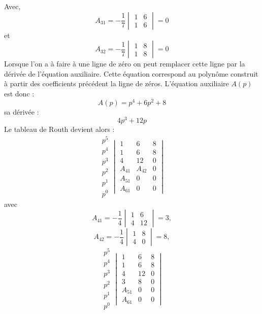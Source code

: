Avec,
\[
A_{31}=-\dfrac{1}{7}\begin{vmatrix}1 & 6 \\ 1& 6\end{vmatrix} = 0
\]
et 
\[
A_{32}=-\dfrac{1}{7}\begin{vmatrix}1 & 8 \\ 1& 8\end{vmatrix} = 0
\]
Lorsque l'on a à faire à une ligne de zéro on peut remplacer cette ligne 
par la dérivée de l'équation auxiliaire. Cette équation correspond au polynôme 
construit à partir des coefficients précédent la ligne de zéros.
L'équation auxiliaire $A(p)$ est donc :
\[
A(p)=p^4+6p^2+8
\]
sa dérivée :
\[
4p^3+12p
\]
Le tableau de Routh devient alors :
\[
\begin{matrix}
    p^5 \\[1em]
    p^4 \\[1em]
    \hline
    p^3 \\[1em]
    p^2 \\[1em]
    p^1 \\[1em]
    p^0 
\end{matrix}
\begin{vmatrix}
    1  & 6   & 8 \\[1em]
    1  & 6   & 8 \\[1em] 
    \hline
    4 & 12 & 0\\[1em]
    A_{41} & A_{42} & 0\\[1em]
    A_{51} & 0      & 0\\[1em]
    A_{61} & 0 & 0
\end{vmatrix}
\]
avec 
\[
A_{41}=-\dfrac{1}{4}\begin{vmatrix}1 & 6 \\ 4& 12\end{vmatrix}=3, 
\]
\[
A_{42}=-\dfrac{1}{4}\begin{vmatrix}1 & 8 \\ 4& 0\end{vmatrix}=8,
\]
\[
\begin{matrix}
    p^5 \\[1em]
    p^4 \\[1em]
    \hline
    p^3 \\[1em]
    p^2 \\[1em]
    p^1 \\[1em]
    p^0 
\end{matrix}
\begin{vmatrix}
    1  & 6   & 8 \\[1em]
    1  & 6   & 8 \\[1em] 
    \hline
    4 & 12 & 0\\[1em]
    3 & 8 & 0\\[1em]
    A_{51} & 0      & 0\\[1em]
    A_{61} & 0 & 0
\end{vmatrix}
\]

